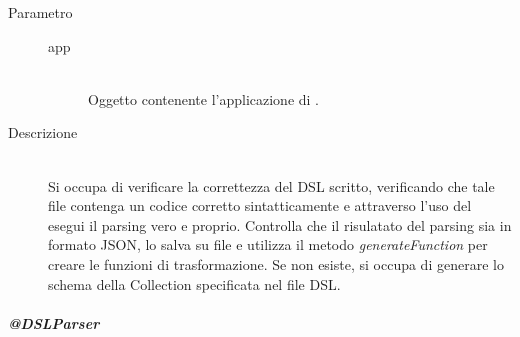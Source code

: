 \begin{description}
\begin{mldescription}
  \hfill 
 	\begin{description}
    		\item[Parametro] \hfill
    			\begin{description}
    				\item[app] \hfill \\
    				Oggetto contenente l'applicazione di .
    			\end{description}
    		\item[Descrizione] \hfill \\
    		Si occupa di verificare la correttezza del DSL scritto, verificando che tale file contenga un codice corretto sintatticamente e attraverso l'uso del  esegui il parsing vero e proprio. Controlla che il risulatato del parsing sia in formato JSON, lo salva su file e utilizza il metodo \textit{generateFunction} per creare le funzioni di trasformazione. Se non esiste, si occupa di generare lo schema  della Collection specificata nel file DSL.
    \end{description}
 \end{mldescription}
 
\end{description}
\subparagraph{@DSLParser}
